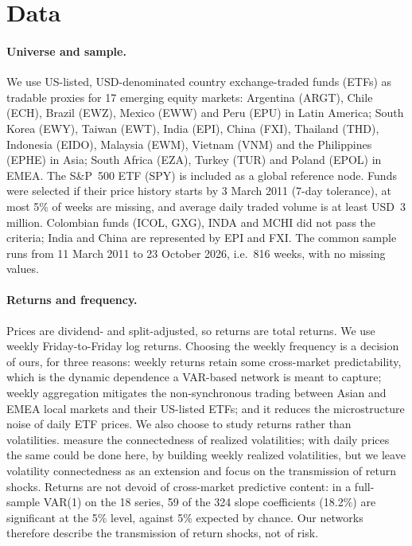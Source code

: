 \section{Data}\label{sec:data}

\paragraph{Universe and sample.} We use US-listed, USD-denominated country exchange-traded funds (ETFs) as tradable proxies for 17 emerging equity markets: Argentina (ARGT), Chile (ECH), Brazil (EWZ), Mexico (EWW) and Peru (EPU) in Latin America; South Korea (EWY), Taiwan (EWT), India (EPI), China (FXI), Thailand (THD), Indonesia (EIDO), Malaysia (EWM), Vietnam (VNM) and the Philippines (EPHE) in Asia; South Africa (EZA), Turkey (TUR) and Poland (EPOL) in EMEA. The S\&P~500 ETF (SPY) is included as a global reference node. Funds were selected if their price history starts by 3 March 2011 (7-day tolerance), at most 5\% of weeks are missing, and average daily traded volume is at least USD~3 million. Colombian funds (ICOL, GXG), INDA and MCHI did not pass the criteria; India and China are represented by EPI and FXI. The common sample runs from 11 March 2011 to 23 October 2026, i.e.\ 816 weeks, with no missing values.

\paragraph{Returns and frequency.} Prices are dividend- and split-adjusted, so returns are total returns. We use weekly Friday-to-Friday log returns. Choosing the weekly frequency is a decision of ours, for three reasons: weekly returns retain some cross-market predictability, which is the dynamic dependence a VAR-based network is meant to capture; weekly aggregation mitigates the non-synchronous trading between Asian and EMEA local markets and their US-listed ETFs; and it reduces the microstructure noise of daily ETF prices. We also choose to study returns rather than volatilities. \citet{diebold2014network} measure the connectedness of realized volatilities; with daily prices the same could be done here, by building weekly realized volatilities, but we leave volatility connectedness as an extension and focus on the transmission of return shocks. Returns are not devoid of cross-market predictive content: in a full-sample VAR(1) on the 18 series, 59 of the 324 slope coefficients (18.2\%) are significant at the 5\% level, against 5\% expected by chance. Our networks therefore describe the transmission of return shocks, not of risk.

